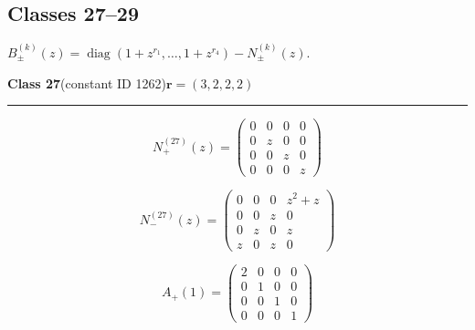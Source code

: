 \subsection*{Classes 27--29}
\noindent $B_\pm^{(k)}(z)=\operatorname{diag}(1+z^{r_1},\ldots,1+z^{r_4})-N_\pm^{(k)}(z)$.\par\medskip
\noindent\begin{minipage}{\linewidth}
\noindent\textbf{Class 27}\quad\small (constant ID 1262)\hfill $\symbf{r}=(3,2,2,2)$
\par\smallskip\noindent\textcolor{rulegray}{\rule{\linewidth}{0.3pt}}
\begin{minipage}[c]{0.495\linewidth}\centering\fontsize{9.7}{12}\selectfont
\setlength{\abovedisplayskip}{4pt}\setlength{\belowdisplayskip}{4pt}
\setlength{\abovedisplayshortskip}{4pt}\setlength{\belowdisplayshortskip}{4pt}
\setlength{\arraycolsep}{3pt}\renewcommand{\arraystretch}{1.08}
\[N_{+}^{(27)}(z)=\begin{pmatrix}0 & 0 & 0 & 0\\0 & z & 0 & 0\\0 & 0 & z & 0\\0 & 0 & 0 & z\end{pmatrix}\]
\end{minipage}%
\begin{minipage}[c]{0.495\linewidth}\centering\fontsize{9.7}{12}\selectfont
\setlength{\abovedisplayskip}{4pt}\setlength{\belowdisplayskip}{4pt}
\setlength{\abovedisplayshortskip}{4pt}\setlength{\belowdisplayshortskip}{4pt}
\setlength{\arraycolsep}{3pt}\renewcommand{\arraystretch}{1.08}
\[N_{-}^{(27)}(z)=\begin{pmatrix}0 & 0 & 0 & z^{2} + z\\0 & 0 & z & 0\\0 & z & 0 & z\\z & 0 & z & 0\end{pmatrix}\]
\end{minipage}%
\par\noindent
\begin{minipage}[c]{0.495\linewidth}\centering\fontsize{9.7}{12}\selectfont
\setlength{\abovedisplayskip}{4pt}\setlength{\belowdisplayskip}{4pt}
\setlength{\abovedisplayshortskip}{4pt}\setlength{\belowdisplayshortskip}{4pt}
\setlength{\arraycolsep}{3pt}\renewcommand{\arraystretch}{1.08}
\[A_{+}(1)=\begin{pmatrix}2 & 0 & 0 & 0\\0 & 1 & 0 & 0\\0 & 0 & 1 & 0\\0 & 0 & 0 & 1\end{pmatrix}\]

\end{minipage}
\end{minipage}
